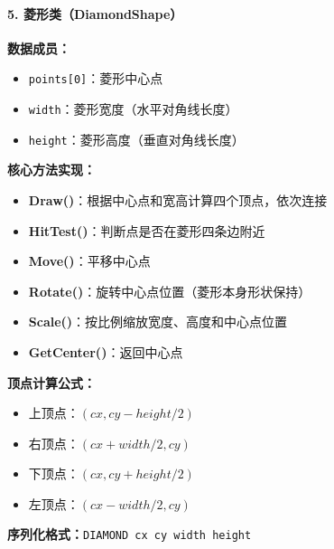 \documentclass[12pt,a4paper]{article}
\begin{document}
\paragraph{5. 菱形类（DiamondShape）}

\begin{tcolorbox}
\textbf{数据成员：}
\begin{itemize}
    \item \texttt{points[0]}：菱形中心点
    \item \texttt{width}：菱形宽度（水平对角线长度）
    \item \texttt{height}：菱形高度（垂直对角线长度）
\end{itemize}

\textbf{核心方法实现：}
\begin{itemize}
    \item \textbf{Draw()}：根据中心点和宽高计算四个顶点，依次连接
    \item \textbf{HitTest()}：判断点是否在菱形四条边附近
    \item \textbf{Move()}：平移中心点
    \item \textbf{Rotate()}：旋转中心点位置（菱形本身形状保持）
    \item \textbf{Scale()}：按比例缩放宽度、高度和中心点位置
    \item \textbf{GetCenter()}：返回中心点
\end{itemize}

\textbf{顶点计算公式：}
\begin{itemize}
    \item 上顶点：$(cx, cy - height/2)$
    \item 右顶点：$(cx + width/2, cy)$
    \item 下顶点：$(cx, cy + height/2)$
    \item 左顶点：$(cx - width/2, cy)$
\end{itemize}

\textbf{序列化格式：}\texttt{DIAMOND cx cy width height}
\end{tcolorbox}
\end{document}
